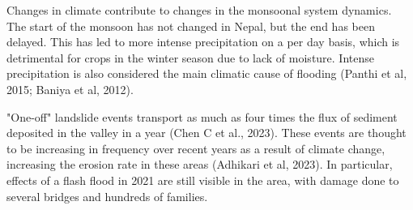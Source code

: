 Changes in climate contribute to changes in the monsoonal system dynamics. The start of the monsoon has not changed in Nepal, but the end has been delayed. This has led to more intense precipitation on a per day basis, which is detrimental for crops in the winter season due to lack of moisture. Intense precipitation is also considered the main climatic cause of flooding (Panthi et al, 2015; Baniya et al, 2012). 

\bsk

"One-off" landslide events transport as much as four times the flux of sediment deposited in the valley in a year (Chen C et al., 2023). These events are thought to be increasing in frequency over recent years as a result of climate change, increasing the erosion rate in these areas (Adhikari et al, 2023). In particular, effects of a flash flood in 2021 are still visible in the area, with damage done to several bridges and hundreds of families. 



